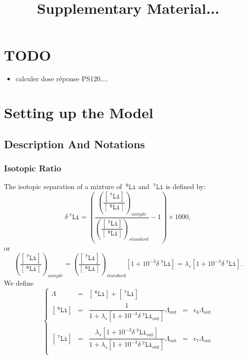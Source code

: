 \documentclass[aps,onecolumn,12pt]{revtex4}
\newcommand{\mychem}[1]{\mathtt{#1}}
\newcommand{\myconc}[1]{\left\lbrack{#1}\right\rbrack}
\newcommand{\spLi}[1]{{~^{\mychem{#1}}\mychem{Li}}}
\newcommand{\Li}[1]{\myconc{\spLi{#1}}}
\newcommand{\deltaLi}{ {\delta\!\!\!\spLi{7}} }
\newcommand{\deltaLiOut}{{\deltaLi}_{\mathrm{out}}}
\newcommand{\LiAll}{\Lambda}
\newcommand{\LiAllOut}{{\LiAll}_{\mathrm{out}}}
\begin{document}
\title{Supplementary Material...}
\maketitle

\section{TODO}
\begin{itemize}
\item calculer dose réponse PS120....
\end{itemize}

\section{Setting up the Model}

\subsection{Description And Notations}

\subsubsection{Isotopic Ratio}
The isotopic separation of a mixture of $\spLi{6}$ and $\spLi{7}$ is defined by:
\begin{equation}
	\deltaLi = \left(
		\dfrac{\left(\dfrac{\Li{7}}{\Li{6}}\right)_{sample}}
		{\left(\dfrac{\Li{7}}{\Li{6}}\right)_{standard}}
		 -1 
	\right) \times 1000,
\end{equation}
or
\begin{equation}
	\left(\dfrac{\Li{7}}{\Li{6}}\right)_{sample} = \left(\dfrac{\Li{7}}{\Li{6}}\right)_{standard} \left[1+10^{-3}\deltaLi\right] = \lambda_s \left[1+10^{-3}\deltaLi\right].
\end{equation}
We define
\begin{equation}
\left\lbrace
\begin{array}{rclcl}
	\LiAll & = & \Li{6} + \Li{7}\\
	\Li{6} & = & \dfrac{1}{1+\lambda_s \left[1+10^{-3}\deltaLiOut\right] } \LiAllOut & = & \epsilon_6 \LiAllOut   \\
	\\
	\Li{7} & = & \dfrac{\lambda_s \left[1+10^{-3}\deltaLiOut\right]}{1+\lambda_s \left[1+10^{-3}\deltaLiOut\right] } \LiAllOut & = & \epsilon_7 \LiAllOut\\
\end{array}
\right.
\end{equation}
\end{document}
